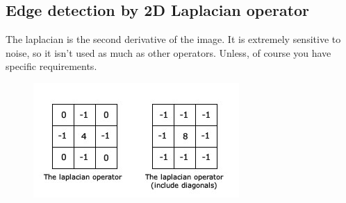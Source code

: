 \subsection{Edge detection by 2D Laplacian operator}
The laplacian is the second derivative of the image. It is extremely sensitive to noise, so it isn't used as much as other operators. Unless, of course you have specific requirements.
\begin{figure}[!htbp]
	\centering
	\includegraphics[width=.5\textwidth]{6DL/figures/conv-laplacian.jpg}\\
\end{figure}

